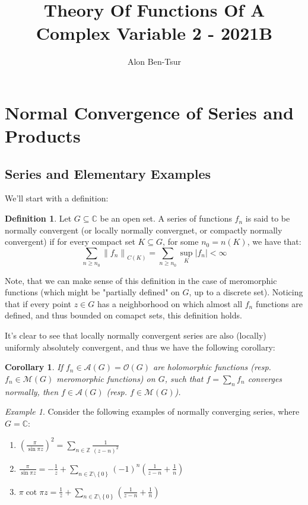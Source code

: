 \documentclass[11pt]{article} %
\title{Theory Of Functions Of A Complex Variable 2 - 2021B}
\author{Alon Ben-Tsur}
\newtheorem{corollary}[theorem]{Corollary}
\theoremstyle{definition}
\newtheorem{definition}[theorem]{Definition}
\theoremstyle{remark}
\newtheorem{example}[theorem]{Example}
\begin{document}
\maketitle

\section{Normal Convergence of Series and Products}

\subsection{Series and Elementary Examples}

We'll start with a definition:

\begin{definition}
Let $G \subseteq \mathbb{C}$ be an open set. A series of functions $f_n$ is said to be normally convergent (or locally normally convergnet, or compactly normally convergent) if for every compact set $K \subseteq G$, for some $n_0 = n\left(K\right)$, we have that:
\[ \sum _{n \geq n_0} \left\lVert f_n \right\rVert_{C\left(K\right)} = \sum _{n \geq n_0} \sup _K \left|f_n\right| < \infty \]
\end{definition}

Note, that we can make sense of this definition in the case of meromorphic functions (which might be "partially defined" on $G$, up to a discrete set). Noticing that if every point $z \in G$ has a neighborhood on which almost all $f_n$ functions are defined, and thus bounded on comapct sets, this definition holds.

It's clear to see that locally normally convergent series are also (locally) uniformly absolutely convergent, and thus we have the following corollary:

\begin{corollary}
If $f_n \in \mathcal{A}\left(G\right) = \mathcal{O}\left(G\right)$ are holomorphic functions (resp. $f_n \in \mathcal{M}\left(G\right)$ meromorphic functions) on $G$, such that $f = \sum_n f_n$ converges normally, then $f \in \mathcal{A}\left(G\right)$ (resp. $f \in \mathcal{M}\left(G\right)$).
\end{corollary}

\begin{example}
Consider the following examples of normally converging series, where $G = \mathbb{C}$:

\begin{enumerate}
\item $\left(\frac{\pi}{\sin\pi z}\right)^2 = \sum_{n\in\mathbb{Z}} \frac{1}{\left(z-n\right)^2}$
\item $\frac{\pi}{\sin\pi z}= -\frac{1}{z} + \sum_{n\in\mathbb{Z}\setminus\left\{0\right\}}\left(-1\right)^n \left(\frac{1}{z-n} + \frac{1}{n}\right)$
\item $\pi \cot \pi z =  \frac{1}{z} + \sum_{n\in\mathbb{Z}\setminus\left\{0\right\}} \left(\frac{1}{z-n} + \frac{1}{n}\right)$
\end{enumerate}
\end{example}
\end{document}
